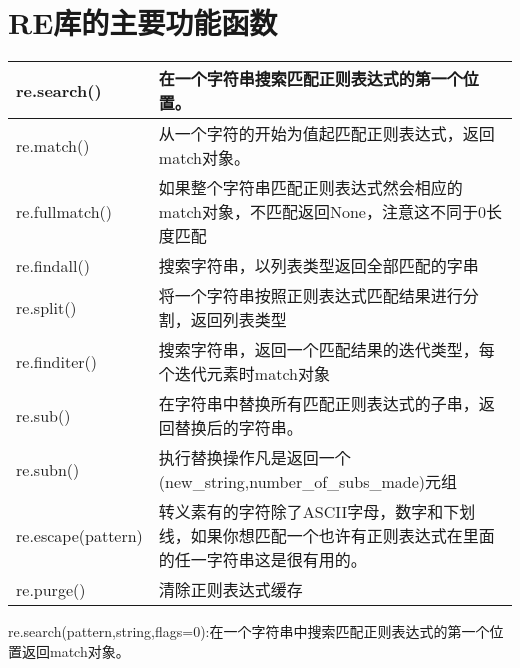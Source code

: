 \documentclass{book}
\begin{document}
\section{RE库的主要功能函数}
\begin{center}
\begin{tabular}{|p{3cm}|p{12cm}|}
\hline
re.search()&在一个字符串搜索匹配正则表达式的第一个位置。\\
\hline
re.match()&从一个字符的开始为值起匹配正则表达式，返回match对象。\\
\hline
re.fullmatch()&如果整个字符串匹配正则表达式然会相应的match对象，不匹配返回None，注意这不同于0长度匹配\\
\hline
re.findall()&搜索字符串，以列表类型返回全部匹配的字串\\
\hline
re.split()&将一个字符串按照正则表达式匹配结果进行分割，返回列表类型\\
\hline
re.finditer()&搜索字符串，返回一个匹配结果的迭代类型，每个迭代元素时match对象\\
\hline
re.sub()&在字符串中替换所有匹配正则表达式的子串，返回替换后的字符串。\\
\hline
re.subn()&执行替换操作凡是返回一个(new\_string,number\_of\_subs\_made)元组\\
\hline
re.escape(pattern)&转义素有的字符除了ASCII字母，数字和下划线，如果你想匹配一个也许有正则表达式在里面的任一字符串这是很有用的。\\
\hline
re.purge()&清除正则表达式缓存\\
\hline
\end{tabular}
\end{center}
re.search(pattern,string,flags=0):在一个字符串中搜索匹配正则表达式的第一个位置返回match对象。\newline
\end{document}
